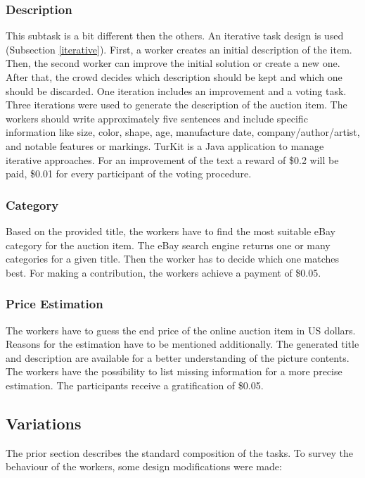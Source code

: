 \subsubsection{Description}
This subtask is a bit different then the others. An iterative task design is used (Subsection \ref{iterative}). First, a worker creates an initial description of the item. Then, the second worker can improve the initial solution or create a new one. After that, the crowd decides which description should be kept and which one should be discarded. One iteration includes an improvement and a voting task. Three iterations were used to generate the description of the auction item. The workers should write approximately five sentences and include specific information like size, color, shape, age, manufacture date, company/author/artist, and notable features or markings. TurKit is a Java application to manage iterative approaches. For an improvement of the text a reward of \$0.2 will be paid, \$0.01 for every participant of the voting procedure.
\subsubsection{Category}
Based on the provided title, the workers have to find the most suitable eBay category for the auction item. The eBay search engine returns one or many categories for a given title. Then the worker has to decide which one matches best. For making a contribution, the workers achieve a payment of \$0.05.
\subsubsection{Price Estimation}
The workers have to guess the end price of the online auction item in US dollars. Reasons for the estimation have to be mentioned additionally. The generated title and description are available for a better understanding of the picture contents. The workers have the possibility to list missing information for a more precise estimation. The participants receive a gratification of \$0.05.

\subsection{Variations}
The prior section describes the standard composition of the tasks. To survey the behaviour of the workers, some design modifications were made: 
